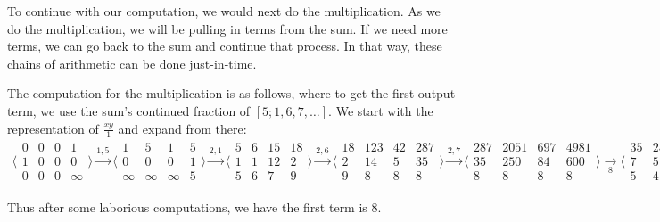 \documentclass[12pt]{article}
\begin{document}
To continue with our computation, we would next do the multiplication. As we do the multiplication, we will be pulling in terms from the sum. If we need more terms, we can go back to the sum and continue that process. In that way, these chains of arithmetic can be done just-in-time. 

The computation for the multiplication is as follows, where to get the first output term, we use the sum's continued fraction of $[5; 1, 6, 7, \ldots]$. We start with the representation of $\frac{xy}{1}$ and expand from there: 
\begin{multline*}
 \big\langle\begin{smallmatrix}
  0 & 0 & 0 & 1\\
  1 & 0 & 0 & 0\\
  0 & 0 & 0 & \infty
\end{smallmatrix}\big\rangle
\xrightarrow{1, 5}
\big\langle\begin{smallmatrix}
  1 & 5 & 1 & 5\\
  0 & 0 & 0 & 1\\
  \infty & \infty & \infty & 5 
\end{smallmatrix}\big\rangle   
\xrightarrow{2, 1}
\big\langle\begin{smallmatrix}
  5 & 6 & 15 & 18\\
  1 & 1 & 12 & 2\\
  5 & 6 & 7 & 9 
\end{smallmatrix}\big\rangle  \xrightarrow{2, 6}
\big\langle\begin{smallmatrix}
  18 & 123 & 42 & 287\\
  2 & 14 & 5 & 35  \\
  9 & 8 & 8 & 8 
\end{smallmatrix}\big\rangle  
\xrightarrow{2, 7}
\big\langle\begin{smallmatrix}
  287 & 2051 & 697 & 4981\\
  35 & 250 & 84 & 600  \\
  8 & 8 & 8 & 8 
\end{smallmatrix}\big\rangle 
\xrightarrow[8]{}
\big\langle\begin{smallmatrix}
  35 & 250 & 84 & 600  \\
  7  & 51 & 25 & 181  \\
  5 & 4 & 3 & 3 
\end{smallmatrix}\big\rangle 
\end{multline*}

Thus after some laborious computations, we have the first term is 8. 
\end{document}
